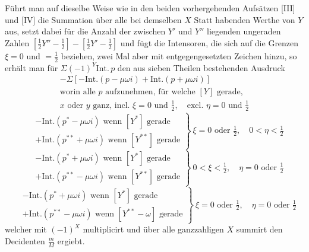 Führt man auf dieselbe Weise wie in den beiden vorhergehenden Aufsätzen [III] und [IV] die Summation über alle bei demselben $X$ Statt habenden Werthe von $Y$ aus, setzt dabei für die Anzahl der zwischen $Y'$ und $Y''$ liegenden ungeraden Zahlen $[\tfrac12Y''-\tfrac12]-[\tfrac12Y'-\tfrac12]$ und fügt die Intensoren, die sich auf die Grenzen $\xi=0$ und $=\tfrac12$ beziehen, zwei Mal aber mit entgegengesetzten Zeichen hinzu, so erhält man für $\Sigma(-1)^Y\mathrm{Int.}\,p$ den aus sieben Theilen bestehenden Ausdruck
\[
\begin{gathered}
-\Sigma[-\mathrm{Int.}(p-\mu\omega i)+\mathrm{Int.}(p+\mu\omega i)]\\
\text{worin alle }p\text{ aufzunehmen, für welche }[Y]\text{ gerade,}\\
x\text{ oder }y\text{ ganz, incl. }\xi=0\text{ und }\tfrac12,\quad
\text{excl. }\eta=0\text{ und }\tfrac12
\end{gathered}
\]
\[
\left.\begin{aligned}
&-\mathrm{Int.}(p^{*}-\mu\omega i)\text{ wenn }[Y^{*}]\text{ gerade}\\
&+\mathrm{Int.}(p^{**}+\mu\omega i)\text{ wenn }[Y^{**}]\text{ gerade}
\end{aligned}\right\}\ \xi=0\text{ oder }\tfrac12,\quad0<\eta<\tfrac12
\]
\[
\left.\begin{aligned}
&-\mathrm{Int.}(p^{*}+\mu\omega i)\text{ wenn }[Y^{*}]\text{ gerade}\\
&+\mathrm{Int.}(p^{**}-\mu\omega i)\text{ wenn }[Y^{**}]\text{ gerade}
\end{aligned}\right\}\ 0<\xi<\tfrac12,\quad\eta=0\text{ oder }\tfrac12
\]
\[
\left.\begin{aligned}
&-\mathrm{Int.}(p^{*}+\mu\omega i)\text{ wenn }[Y^{*}]\text{ gerade}\\
&+\mathrm{Int.}(p^{**}-\mu\omega i)\text{ wenn }[Y^{**}-\omega]\text{ gerade}
\end{aligned}\right\}\ \xi=0\text{ oder }\tfrac12,\quad\eta=0\text{ oder }\tfrac12
\]
welcher mit $(-1)^X$ multiplicirt und über alle ganzzahligen $X$ summirt den Decidenten $\frac mM$ ergiebt.

